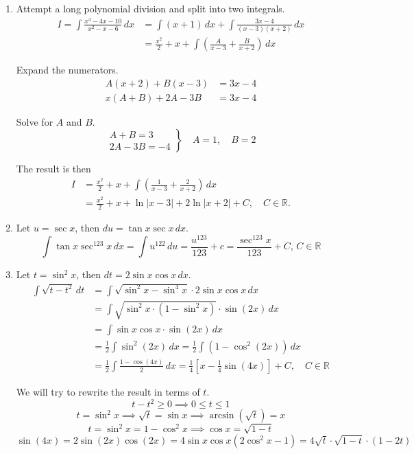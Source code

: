 \documentclass[a4paper, 12pt]{article}
\begin{document}
\begin{enumerate}[leftmargin=*,label=\textbf{\arabic*.}]
\begin{enumerate}[leftmargin=*,label=\textbf{\alph*.}]
\item Attempt a long polynomial division and split into two integrals.
\begin{align*}
I=\int\frac{x^3-4x-10}{x^2-x-6}\,dx&=\int(x+1)\,dx+\int\frac{3x-4}{(x-3)(x+2)}\,dx\\[1em]&=\frac{x^2}2+x+\int\left({\frac{A}{x-3}+\frac{B}{x+2}}\right)\,dx
\end{align*}

Expand the numerators.
\begin{align*}
A(x+2)+B(x-3)&=3x-4\\
x(A+B)+2A-3B&=3x-4
\end{align*}

Solve for $A$ and $B$.
\[
\left.
\begin{array}{ll}
A+B=3\\
2A-3B=-4
\end{array}
\right\}
\quad A=1,\quad B=2
\]

The result is then
\begin{align*}
I &= \frac{x^2}{2}+x+\int\left(\frac{1}{x-3}+\frac{2}{x+2}\right)\,dx \\
  &= \boxed{\frac{x^2}{2}+x+\ln|x-3|+2\ln|x+2|+C,\quad C\in\mathbb{R}}.
\end{align*}

\item Let $u=\sec x$, then $du=\tan x \sec x \,dx$.
\[\int\tan x\sec^{123}x\,dx=\int u^{122}\,du=\frac{u^{123}}{123}+c = \boxed{\frac{\sec^{123}x}{123}+C,\,C\in\mathbb{R}}\]

\item Let $t=\sin^2x$, then $dt=2\sin x\cos x\,dx$.
\begin{align*}\int\sqrt{t-t^2}\,dt&=\int\sqrt{\sin^2x-\sin^4x}\cdot2\sin x \cos x \,dx\\[1em]&=\int\sqrt{\sin^2x\cdot(1-\sin^2x)}\cdot\sin(2x)\,dx\\[1em]&=\int\sin x \cos x\cdot\sin(2x)\,dx\\[1em]&=\frac12\int\sin^2(2x)\,dx=\frac12\int\left(1-\cos^2(2x)\right)\,dx\\[1em]&=\frac12\int\frac{1-\cos(4x)}2\,dx=\frac14\left[x-\frac14\sin(4x)\right]+C,\quad C\in\mathbb{R}\end{align*}

We will try to rewrite the result in terms of $t$.
\[t-t^2 \geq 0\implies 0\leq t \leq 1\]
\[t=\sin^2x \implies\sqrt t = \sin x\implies\arcsin\left(\sqrt t\right) = x\]
\[t=\sin^2x=1-\cos^2x\implies \cos x= \sqrt{1-t}\]
\[\sin(4x)=2\sin(2x)\cos(2x)=4\sin x\cos x\left(2\cos^2x-1\right)=4\sqrt t\cdot\sqrt{1-t}\cdot(1-2t)\]


\end{enumerate}
\end{enumerate}
\end{document}
